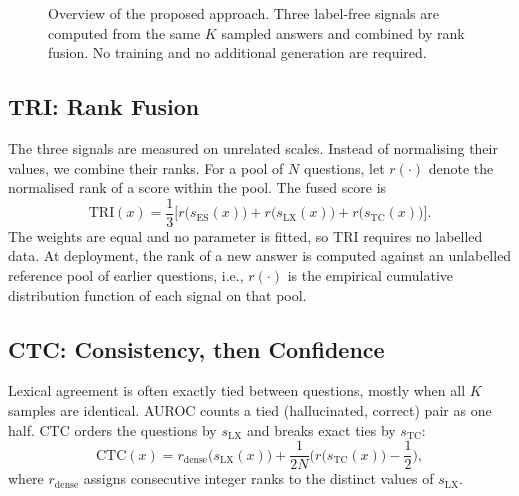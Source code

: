 \documentclass[10pt]{article}
\newcommand{\sES}{s_{\mathrm{ES}}}
\newcommand{\sLX}{s_{\mathrm{LX}}}
\newcommand{\sTC}{s_{\mathrm{TC}}}
\begin{document}
\begin{figure}[t]
\centering
{}
\caption{Overview of the proposed approach. Three label-free signals are computed from the same $K$ sampled answers and combined by rank fusion. No training and no additional generation are required.}
\label{fig:method}
\end{figure}

\subsection{TRI: Rank Fusion}
The three signals are measured on unrelated scales. Instead of normalising their values, we combine their ranks. For a pool of $N$ questions, let $r(\cdot)$ denote the normalised rank of a score within the pool. The fused score is
\begin{equation}
\mathrm{TRI}(x)=\frac13\Big[r\big(\sES(x)\big)+r\big(\sLX(x)\big)+r\big(\sTC(x)\big)\Big].
\label{eq:tri}
\end{equation}
The weights are equal and no parameter is fitted, so TRI requires no labelled data. At deployment, the rank of a new answer is computed against an unlabelled reference pool of earlier questions, i.e., $r(\cdot)$ is the empirical cumulative distribution function of each signal on that pool.

\subsection{CTC: Consistency, then Confidence}
Lexical agreement is often exactly tied between questions, mostly when all $K$ samples are identical. AUROC counts a tied (hallucinated, correct) pair as one half. CTC orders the questions by $\sLX$ and breaks exact ties by $\sTC$:
\begin{equation}
\mathrm{CTC}(x)=r_{\mathrm{dense}}\big(\sLX(x)\big)+\frac{1}{2N}\Big(r\big(\sTC(x)\big)-\frac12\Big),
\label{eq:ctc}
\end{equation}
where $r_{\mathrm{dense}}$ assigns consecutive integer ranks to the distinct values of $\sLX$.
\end{document}
